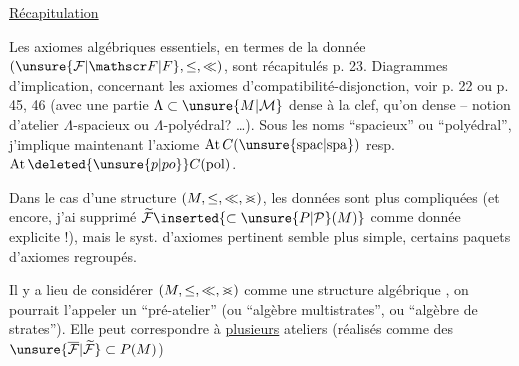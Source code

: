 
\uline{Récapitulation}

Les axiomes algébriques essentiels, en termes de la donnée $(\unsure{\mathcal F|\mathscr F|F},\leq,\ll)$, sont récapitulés p. 23. Diagrammes d'implication, concernant les axiomes d'compatibilité-disjonction, voir p. 22 ou p. 45, 46 (avec une \deleted{$\unsure{\Lambda|\wedge}$} partie $\Lambda\subset\unsure{M|\mathcal M}$ dense à la clef, qu'on   dense -- notion d'atelier $\Lambda$-spacieux ou $\Lambda$-polyédral? \ldots). Sous les noms ``spacieux'' ou ``polyédral'', j'implique maintenant l'axiome $\mathrm{At}\,C(\unsure{\mathrm{spac}|\mathrm{spa}})$ resp. $\mathrm{At}\,\deleted{\unsure{p|po}}C(\mathrm{pol})$.

Dans le cas d'une structure $(M,\leq,\ll,\mathrel{>\mkern-13mu<})$, les données sont  plus compliquées (et encore, j'ai supprimé $\widetilde{\mathcal F}\inserted{\subset\unsure{P|\mathcal P}(M)}$ comme donnée explicite !), mais le syst. d'axiomes pertinent semble plus simple,    certains paquets d'axiomes regroupés.

Il y a lieu de considérer $(M,\leq,\ll,\mathrel{>\mkern-13mu<})$ comme une structure algébrique , on pourrait l'appeler un ``pré-atelier'' (ou ``algèbre  multistrates''\deleted{\unsure{)|\}}}, ou ``algèbre de strates''). Elle peut correspondre à \uline{plusieurs} ateliers (réalisés comme des $\unsure{\overline{\mathcal F}|\widetilde{\mathcal F}}\subset P(M)$)

